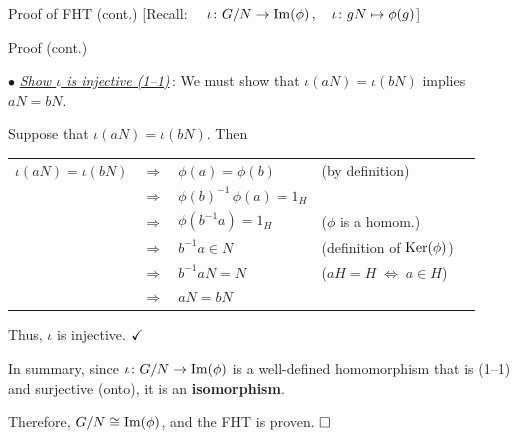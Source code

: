 \documentclass[8pt, handout]{beamer}
\newcommand{\Pause}{}      %
\begin{document}
\begin{frame}{Proof of FHT (cont.) [{\small Recall: 
        $\quad\iota\colon G/N\rightarrow\operatorname{Im}(\phi)\,,\quad\iota\colon 
        gN\mapsto\phi(g)$}]}
  
  \begin{exampleblock}{Proof (cont.)} %
    
    $\bullet$ \underline{\emph{Show $\iota$ is injective (1--1)}}\,: \Pause
    We must show that $\iota(aN)=\iota(bN)$ implies $aN=bN$.
    
    \pause
    \bigskip
    
    Suppose that $\iota(aN)=\iota(bN)$. \Pause Then
    
    \begin{center}\renewcommand{\arraystretch}{1.2}
      \begin{tabular}{rclll}
        $\iota(aN)=\iota(bN)$ & $\Longrightarrow$ & $\phi(a)=\phi(b)$ & 
        (by definition) \Pause \\
        & $\Longrightarrow$ & $\phi(b)^{-1}\,\phi(a)=1_H$ \Pause & \\ 
        & $\Longrightarrow$ & $\phi(b^{-1}a)=1_H$ &
        ($\phi$ is a homom.) \Pause \\
        & $\Longrightarrow$ & $b^{-1}a\in N$ &
        (definition of $\operatorname{Ker}(\phi)$) \Pause \\
        & $\Longrightarrow$ & $b^{-1}aN=N$ & 
        ($aH=H\;\Leftrightarrow\;a\in H$) \Pause \\
        & $\Longrightarrow$ & $aN=bN$ & 
      \end{tabular}
    \end{center}
    
    Thus, $\iota$ is injective. $\hfill\checkmark$ 
    
    \bigskip\pause
    
    In summary, since $\iota\colon G/N\to\operatorname{Im}(\phi)$ is a well-defined
    homomorphism that is  (1--1) and
    {\color{blue}surjective} (onto), it is an \textbf{isomorphism}.
    
    \bigskip\Pause
    
    Therefore, $G/N\cong\operatorname{Im}(\phi)$, and the FHT is proven. $\hfill\Box$
    
  \end{exampleblock}
  
\end{frame}

\end{document}
